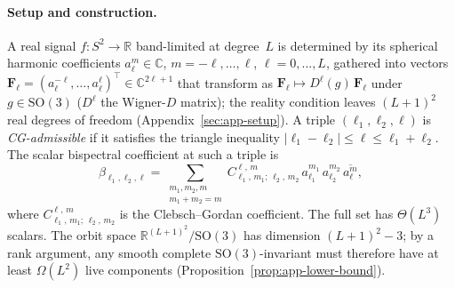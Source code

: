 \documentclass{article}
\theoremstyle{definition}
\theoremstyle{remark}
\newcommand{\R}{\mathbb{R}}
\newcommand{\C}{\mathbb{C}}
\newcommand{\SO}{\mathrm{SO}}
\newcommand{\CG}[6]{C^{#5,\,#6}_{#1,\,#2;\,#3,\,#4}}
\newcommand{\conj}[1]{\overline{#1}}
\theoremstyle{definition}
\begin{document}
\paragraph{Setup and construction.} A real signal $f : S^2 \to \R$
band-limited at degree~$L$ is determined by its spherical harmonic
coefficients $a_\ell^m\in\C$, $m=-\ell,\dots,\ell$, $\ell=0,\dots,L$,
gathered into vectors $\mathbf{F}_\ell = (a_\ell^{-\ell},\dots,
a_\ell^{\ell})^\top \in \C^{2\ell+1}$ that transform as
$\mathbf{F}_\ell \mapsto D^\ell(g)\,\mathbf{F}_\ell$ under
$g\in\SO(3)$ ($D^\ell$ the Wigner-$D$ matrix); the reality condition
leaves $(L{+}1)^2$ real degrees of freedom
(Appendix~\ref{sec:app-setup}).
A triple $(\ell_1,\ell_2,\ell)$ is \emph{CG-admissible} if it
satisfies the triangle inequality
$|\ell_1-\ell_2|\le\ell\le\ell_1+\ell_2$. The scalar bispectral
coefficient at such a triple is
\begin{equation}\label{eq:s6-bispectrum}
  \beta_{\ell_1,\ell_2,\ell}
  = \!\!\!\sum_{\substack{m_1,m_2,m\\ m_1+m_2=m}}\!\!\!
    \CG{\ell_1}{m_1}{\ell_2}{m_2}{\ell}{m}\,
    a_{\ell_1}^{m_1}\,a_{\ell_2}^{m_2}\,\conj{a_\ell^m},
\end{equation}
where $\CG{\ell_1}{m_1}{\ell_2}{m_2}{\ell}{m}$ is the Clebsch--Gordan
coefficient. The full set has $\Theta(L^3)$ scalars. The orbit space
$\R^{(L+1)^2}/\SO(3)$ has dimension $(L{+}1)^2 - 3$; by a rank
argument, any smooth complete $\SO(3)$-invariant must therefore have
at least $\Omega(L^2)$ live components
(Proposition~\ref{prop:app-lower-bound}). 
\end{document}
